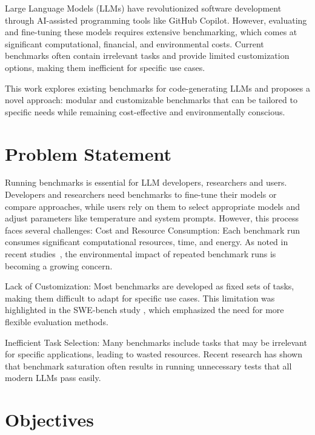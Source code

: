 Large Language Models (LLMs) have revolutionized software development through AI-assisted programming tools like GitHub Copilot. However, evaluating and fine-tuning these models requires extensive benchmarking, which comes at significant computational, financial, and environmental costs. Current benchmarks often contain irrelevant tasks and provide limited customization options, making them inefficient for specific use cases.

This work explores existing benchmarks for code-generating LLMs and proposes a novel approach: modular and customizable benchmarks that can be tailored to specific needs while remaining cost-effective and environmentally conscious.

\section{Problem Statement}

Running benchmarks is essential for LLM developers, researchers and users. Developers and researchers need benchmarks to fine-tune their models or compare approaches, while users rely on them to select appropriate models and adjust parameters like temperature and system prompts. However, this process faces several challenges:
Cost and Resource Consumption: Each benchmark run consumes significant computational resources, time, and energy. As noted in recent studies~\cite{ ????  ?????}, the environmental impact of repeated benchmark runs is becoming a growing concern.

Lack of Customization: Most benchmarks are developed as fixed sets of tasks, making them difficult to adapt for specific use cases. This limitation was highlighted in the SWE-bench study \cite{jimenez2024swebenchlanguagemodelsresolve}, which emphasized the need for more flexible evaluation methods.

Inefficient Task Selection: Many benchmarks include tasks that may be irrelevant for specific applications, leading to wasted resources. Recent research \cite{vendrow2025largelanguagemodelbenchmarks} has shown that benchmark saturation often results in running unnecessary tests that all modern LLMs pass easily.

\section{Objectives}

